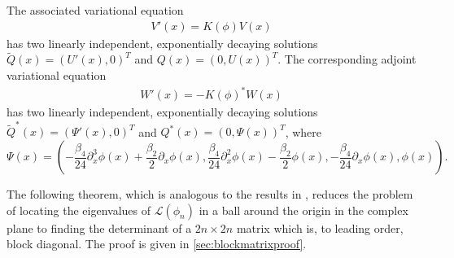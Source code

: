 \documentclass[12pt]{elsarticle}
\def\calL{{\mathcal L}}
\begin{document}
The associated variational equation 
\begin{align}
V'(x) = K(\phi)V(x) \label{vareq}
\end{align}
has two linearly independent, exponentially decaying solutions $\tilde{Q}(x) = (U'(x), 0)^T$ and $Q(x) = (0, U(x))^T$. The corresponding adjoint variational equation
\begin{align}
W'(x) = -K(\phi)^*W(x)\label{adjvareq}
\end{align}
has two linearly independent, exponentially decaying solutions $\tilde{Q}^*(x) = (\Psi'(x), 0)^T$ and $Q^*(x) = (0, \Psi(x) )^T$, where
\begin{equation}\label{defPsi}
\Psi(x) =
\left( -\frac{\beta_4}{24} \partial_x^3 \phi(x) + \frac{\beta_2}{2} \partial_x \phi(x),
\frac{\beta_4}{24} \partial_x^2 \phi(x) - \frac{\beta_2}{2} \phi(x),
- \frac{\beta_4}{24} \partial_x \phi(x), \phi(x) \right).
\end{equation}

The following theorem, which is analogous to the results in \cite[Section 3.4]{Manukian}, reduces the problem of locating the eigenvalues of $\calL(\phi_n)$ in a ball around the origin in the complex plane to finding the determinant of a $2n\times 2n$ matrix which is, to leading order, block diagonal. The proof is given in \cref{sec:blockmatrixproof}.
\end{document}
